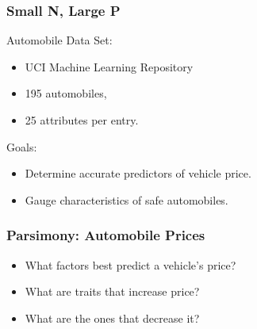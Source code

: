 \documentclass{beamer}
\begin{document}

\author[John Chen]{C. Patton, A. Rumbaugh, T. Provan, O. Prilepova, J. Chen}
\begin{frame}
\frametitle{Small N, Large P}
Automobile Data Set:
\begin{itemize}
  \item UCI Machine Learning Repository
  \item 195 automobiles,
  \item 25 attributes per entry.
\end{itemize}
\Large{
Goals:
\begin{itemize}
  \item Determine accurate predictors of vehicle price.
  \item Gauge characteristics of safe automobiles.
\end{itemize}}
\end{frame}


\begin{frame}
\frametitle{Parsimony: Automobile Prices}
\begin{itemize}
  \item What factors best predict a vehicle's price?\\
  \item What are traits that increase price?\\
  \item What are the ones that decrease it?\\
\end{itemize}
\end{frame}
\end{document}
